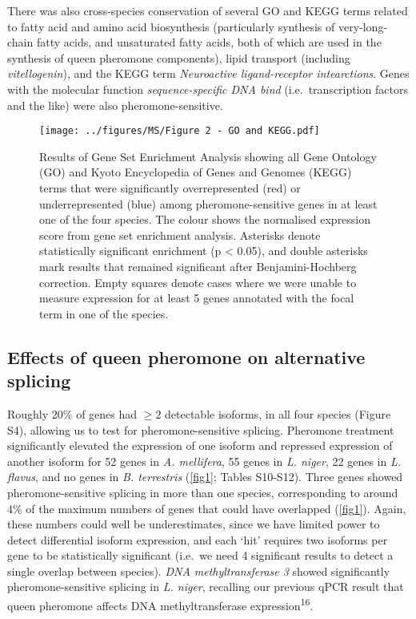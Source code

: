 \documentclass[12pt,]{article}
\begin{document}
There was also cross-species conservation of several GO and KEGG terms
related to fatty acid and amino acid biosynthesis (particularly
synthesis of very-long-chain fatty acids, and unsaturated fatty acids,
both of which are used in the synthesis of queen pheromone components),
lipid transport (including \emph{vitellogenin}), and the KEGG term
\emph{Neuroactive ligand-receptor intearctions}. Genes with the
molecular function \emph{sequence-specific DNA bind} (i.e.~transcription
factors and the like) were also pheromone-sensitive.

\begin{figure}
\centering
\texttt{[image: ../figures/MS/Figure 2 - GO and KEGG.pdf]}
\caption{\footnotesize Results of Gene Set Enrichment Analysis showing
all Gene Ontology (GO) and Kyoto Encyclopedia of Genes and Genomes
(KEGG) terms that were significantly overrepresented (red) or
underrepresented (blue) among pheromone-sensitive genes in at least one
of the four species. The colour shows the normalised expression score
from gene set enrichment analysis. Asterisks denote statistically
significant enrichment (p \textless{} 0.05), and double asterisks mark
results that remained significant after Benjamini-Hochberg correction.
Empty squares denote cases where we were unable to measure expression
for at least 5 genes annotated with the focal term in one of the
species. \label{fig2}}
\end{figure}

\subsection{Effects of queen pheromone on alternative
splicing}\label{effects-of-queen-pheromone-on-alternative-splicing}

Roughly 20\% of genes had \(\ge2\) detectable isoforms, in all four
species (Figure S4), allowing us to test for pheromone-sensitive
splicing. Pheromone treatment significantly elevated the expression of
one isoform and repressed expression of another isoform for 52 genes in
\emph{A. mellifera}, 55 genes in \emph{L. niger}, 22 genes in \emph{L.
flavus}, and no genes in \emph{B. terrestris} (\autoref{fig1}; Tables
S10-S12). Three genes showed pheromone-sensitive splicing in more than
one species, corresponding to around 4\% of the maximum numbers of genes
that could have overlapped (\autoref{fig1}). Again, these numbers could
well be underestimates, since we have limited power to detect
differential isoform expression, and each `hit' requires two isoforms
per gene to be statistically significant (i.e.~we need 4 significant
results to detect a single overlap between species). \emph{DNA
methyltransferase 3} showed significantly pheromone-sensitive splicing
in \emph{L. niger}, recalling our previous qPCR result that queen
pheromone affects DNA methyltransferase expression\textsuperscript{16}.
\end{document}
